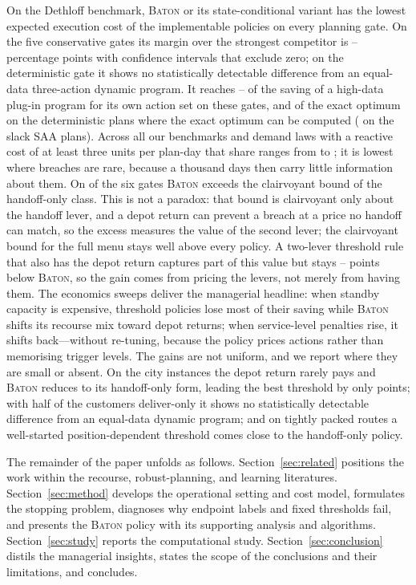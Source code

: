 \documentclass[preprint,authoryear,12pt]{elsarticle}
\theoremstyle{definition}
\theoremstyle{remark}
\begin{document}
On the Dethloff benchmark, \textsc{Baton} or its state-conditional
variant has the lowest expected execution cost of the implementable
policies on every planning gate. On the five conservative gates its
margin over the strongest competitor is \statConsDeltaMin--\statConsDeltaMax{}
percentage points with confidence intervals that exclude zero; on the
deterministic gate it shows no statistically detectable difference from
an equal-data three-action dynamic program.
It reaches \ratioDpThreeLo--\ratioDpThreeHi{} of the saving of a
high-data plug-in program for its own action set on these gates, and
\exDetShare{} of the exact optimum on the deterministic plans where the
exact optimum can be computed (\exSaaShare{} on the slack \textsc{SAA}
plans). Across all our benchmarks and demand laws with a reactive cost of
at least three units per plan-day that share ranges from \ratioAllLo{} to
\ratioAllHi{}; it is lowest
where breaches are rare, because a thousand days then carry little
information about them. On \nOrcBeat{} of the six gates \textsc{Baton}
exceeds the clairvoyant bound of the handoff-only class. This is not a
paradox: that bound is clairvoyant only about the handoff lever, and a
depot return can prevent a breach at a price no handoff can match, so the
excess measures the value of the second lever; the clairvoyant bound for
the full menu stays well above every policy. A two-lever threshold rule
that also has the depot return captures part of this value but stays
\twoGapLo--\twoGapHi{} points below \textsc{Baton}, so the gain comes
from pricing the levers, not merely from having them. The economics
sweeps deliver the managerial headline: when standby capacity is
expensive, threshold policies lose most of their saving while
\textsc{Baton} shifts
its recourse mix toward depot returns; when service-level penalties
rise, it shifts back---without re-tuning, because the policy prices
actions rather than memorising trigger levels. The gains are not
uniform, and we report where they are small or absent. On the city
instances the depot return rarely pays and \textsc{Baton} reduces to its
handoff-only form, leading the best threshold by only \lgCityDelta{}
points; with half of the customers deliver-only it shows no
statistically detectable difference from an equal-data dynamic program; and on tightly packed routes a well-started
position-dependent threshold comes close to the handoff-only policy.

The remainder of the paper unfolds as follows.
Section~\ref{sec:related} positions the work within the recourse,
robust-planning, and learning literatures.
Section~\ref{sec:method} develops the operational setting and cost
model, formulates the stopping problem, diagnoses why endpoint labels
and fixed thresholds fail, and presents the \textsc{Baton} policy with
its supporting analysis and algorithms. Section~\ref{sec:study} reports
the computational study. Section~\ref{sec:conclusion} distils the
managerial insights, states the scope of the conclusions and their
limitations, and concludes.
\end{document}
